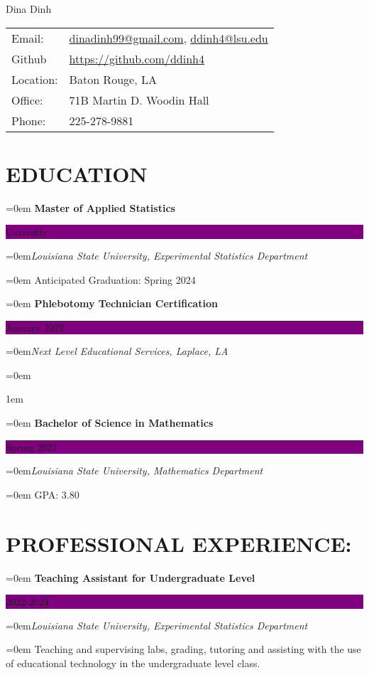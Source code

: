 \documentclass[paper=a4,fontsize=11pt]{scrartcl}
\newcommand{\sepspace}{\vspace*{1em}}		%
\newcommand{\MyName}[1]{
		\Huge \usefont{OT1}{phv}{b}{n}  #1 \hfill		%
		\par \normalsize \normalfont}
\newcommand{\NewPart}[1]{\section*{\uppercase{#1}}}
\newcommand{\DetailEntry}[4]{
		\noindent \hangindent=0em\hangafter=0 \textbf{#1} \hfill 	%
		\colorbox{Purple}{%
			\parbox{10em}{%
			\hfill\color{White}#2}} \par						%
		\vspace{0.2em}
		\noindent \hangindent=0em\hangafter=0\textit{#3} \par		%
		\noindent\hangindent=0em\hangafter=0 \small #4 			%
		\normalsize \par}
\begin{document}
\MyName{Dina Dinh}
\vspace{0.4 cm}




\begin{table}[ht!]
	\begin{minipage}{0.5\linewidth}
		
		\label{table:student}
		\centering
		\begin{tabular}{ll}
			
			Email:          & \href{mailto:dinadinh99@gmail.com}{dinadinh99@gmail.com}, \href{mailto:ddinh4@lsu.edu}{ddinh4@lsu.edu} \\
            Github & \href{https://github.com/ddinh4}{https://github.com/ddinh4}\\
            Location: & Baton Rouge, LA \\
            Office: & 71B Martin D. Woodin Hall\\
            Phone: & 225-278-9881 
		\end{tabular}
	\end{minipage}\hfill
	\begin{minipage}{0.5\linewidth}
		\raggedleft
		
		\label{ }
	\end{minipage}
\end{table}


%



\NewPart{Education}

\DetailEntry{Master of Applied Statistics}{Currently}{Louisiana State University, Experimental Statistics Department}{Anticipated Graduation: Spring 2024}


\vspace{1em}

\DetailEntry{Phlebotomy Technician Certification
}{January 2022}{Next Level Educational Services, Laplace, LA}

\vspace{1em}
\DetailEntry{Bachelor of Science in Mathematics}{Spring 2021}{Louisiana State University, Mathematics Department}{GPA: 3.80}


\NewPart{Professional Experience:}

\DetailEntry{Teaching Assistant for Undergraduate Level}{2022-2024}{Louisiana State University, Experimental Statistics Department}{Teaching and supervising labs, grading, tutoring and assisting with the use of educational technology in the undergraduate level class.}
\end{document}
